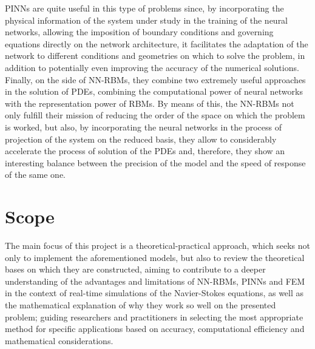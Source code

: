\documentclass[12pt,letterpaper]{article}
\begin{document}
PINNs are quite useful in this type of problems since, by incorporating the physical information of the system under study in the training of the neural networks, allowing the imposition of boundary conditions and governing equations directly on the network architecture, it facilitates the adaptation of the network to different conditions and geometries on which to solve the problem, in addition to potentially even improving the accuracy of the numerical solutions.\\

Finally, on the side of NN-RBMs, they combine two extremely useful approaches in the solution of PDEs, combining the computational power of neural networks with the representation power of RBMs. By means of this, the NN-RBMs not only fulfill their mission of reducing the order of the space on which the problem is worked, but also, by incorporating the neural networks in the process of projection of the system on the reduced basis, they allow to considerably accelerate the process of solution of the PDEs and, therefore, they show an interesting balance between the precision of the model and the speed of response of the same one.


\section{Scope}

The main focus of this project is a theoretical-practical approach, which seeks not only to implement the aforementioned models, but also to review the theoretical bases on which they are constructed, aiming to contribute to a deeper understanding of the advantages and limitations of NN-RBMs, PINNs and FEM in the context of real-time simulations of the Navier-Stokes equations, as well as the mathematical explanation of why they work so well on the presented problem; guiding researchers and practitioners in selecting the most appropriate method for specific applications based on accuracy, computational efficiency and mathematical considerations.\\
\end{document}
